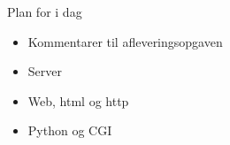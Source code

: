 \documentclass[a4paper,landscape]{slides}
\begin{document}
\begin{slide}
	\begin{center} {\large 
            Plan for i dag
	} \end{center}
	\begin{itemize} \addtolength{\itemsep}{-\baselineskip}
		\item Kommentarer til afleveringsopgaven
		\item Server
		\item Web, html og http
		\item Python og CGI
	\end{itemize}
\end{slide}
\end{document}
